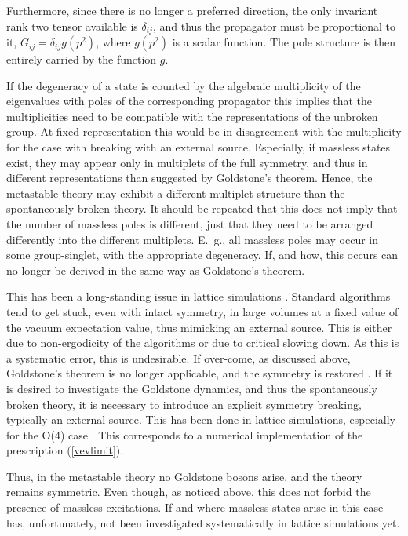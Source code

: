 \documentclass[final,12pt,3p,longtitle]{elsarticle}
\newcommand*{\pref}[1]{(\ref{#1})}
\newcommand*{\1}{1\!\!\!\bot}
\begin{document}
Furthermore, since there is no longer a preferred direction, the only invariant rank two tensor available is $\delta_{ij}$, and thus the propagator must be proportional to it, $G_{ij}=\delta_{ij}g(p^2)$, where $g(p^2)$ is a scalar function. The pole structure is then entirely carried by the function $g$.

If the degeneracy of a state is counted by the algebraic multiplicity of the eigenvalues with poles of the corresponding propagator this implies that the multiplicities need to be compatible with the representations of the unbroken group. At fixed representation this would be in disagreement with the multiplicity for the case with breaking with an external source. Especially, if massless states exist, they may appear only in multiplets of the full symmetry, and thus in different representations than suggested by Goldstone's theorem. Hence, the metastable theory may exhibit a different multiplet structure than the spontaneously broken theory. It should be repeated that this does not imply that the number of massless poles is different, just that they need to be arranged differently into the different multiplets. E.\ g., all massless poles may occur in some group-singlet, with the appropriate degeneracy. If, and how, this occurs can no longer be derived in the same way as Goldstone's theorem. 

This has been a long-standing issue in lattice simulations \cite{Lang:pc}. Standard algorithms tend to get stuck, even with intact symmetry, in large volumes at a fixed value of the vacuum expectation value, thus mimicking an external source. This is either due to non-ergodicity of the algorithms or due to critical slowing down. As this is a systematic error, this is undesirable. If over-come, as discussed above, Goldstone's theorem is no longer applicable, and the symmetry is restored \cite{Lang:pc,Neuberger:1987kt}. If it is desired to investigate the Goldstone dynamics, and thus the spontaneously broken theory, it is necessary to introduce an explicit symmetry breaking, typically an external source. This has been done in lattice simulations, especially for the O(4) case \cite{Luscher:1987ek,Hasenfratz:1988kr,Luscher:1988gc,Hasenfratz:1989ux,Hasenfratz:1990fu,Gockeler:1991sj,Gockeler:1994rx}. This corresponds to a numerical implementation of the prescription \pref{vevlimit}.

Thus, in the metastable theory no Goldstone bosons arise, and the theory remains symmetric. Even though, as noticed above, this does not forbid the presence of massless excitations. If and where massless states arise in this case has, unfortunately, not been investigated systematically in lattice simulations yet.
\end{document}
